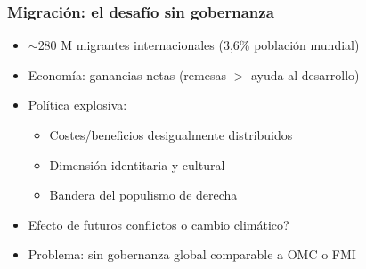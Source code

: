 \begin{frame}
\frametitle{Migración: el desafío sin gobernanza}
\centering

\begin{itemize}
  \item<1-> $\sim$280 M migrantes internacionales (3{,}6\% población mundial)
  \vspace{6pt}
  \item<2-> Economía: ganancias netas (remesas $>$ ayuda al desarrollo)
  \vspace{6pt}
  \item<3-> Política explosiva:
  \begin{itemize}
    \item Costes/beneficios desigualmente distribuidos
    \item Dimensión identitaria y cultural
    \item Bandera del populismo de derecha
  \end{itemize}
  \item<4-> Efecto de futuros conflictos o cambio climático?
  \vspace{6pt}
  \item<5-> \alert{Problema:} sin gobernanza global comparable a OMC o FMI
\end{itemize}
\end{frame}

